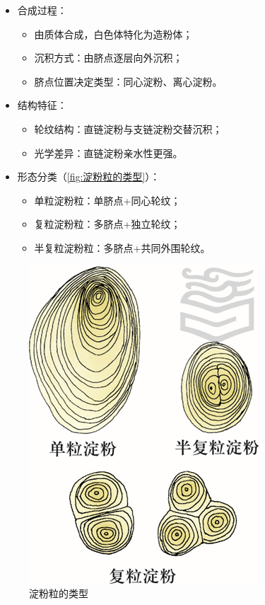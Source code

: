  \begin{itemize}
 	\item 合成过程：
 	\begin{itemize}
 		\item 由质体合成，白色体特化为造粉体；
 		\item 沉积方式：由脐点逐层向外沉积；
 		\item 脐点位置决定类型：同心淀粉、离心淀粉。
 	\end{itemize}
 	\item 结构特征：
 	\begin{itemize}
 		\item 轮纹结构：直链淀粉与支链淀粉交替沉积；
 		\item 光学差异：直链淀粉亲水性更强。
 	\end{itemize}
 	\item 形态分类（\autoref{fig:淀粉粒的类型}）：
 	\begin{itemize}
 		\item 单粒淀粉粒：单脐点+同心轮纹；
 		\item 复粒淀粉粒：多脐点+独立轮纹；
 		\item 半复粒淀粉粒：多脐点+共同外围轮纹。
 	\end{itemize}
 \end{itemize}
 
 \begin{figure}
 	\centering
 	\includegraphics[width=0.3\linewidth]{Pics/淀粉粒的类型}
 	\caption{淀粉粒的类型}
 	\label{fig:淀粉粒的类型}
 \end{figure}
 
